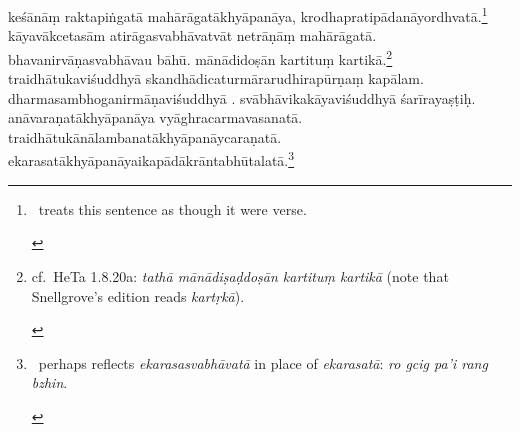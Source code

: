 \documentclass[naipra.tex]{subfiles}
\begin{document}
\begin{sanskrit}

\pstart
keśānāṃ raktapiṅgatā mahārāgatākhyāpanāya, krodhapratipādanāyordhvatā.\footnote{\begin{english}
	\TIB\ treats this sentence as though it were verse.
\end{english}}
kāyavākcetasām atirāgasvabhāvatvāt  netrāṇāṃ mahārāgatā.
bhavanirvāṇasvabhāvau bāhū.
mānādidoṣān kartituṃ kartikā.\footnote{\begin{english}
	cf.\ HeTa 1.8.20a: \emph{tathā mānādiṣaḍdoṣān kartituṃ kartikā} (note that Snellgrove's edition reads \emph{kartṛkā}).
\end{english}}
traidhātukaviśuddhyā skandhādicaturmārarudhirapūrṇaṃ   kapālam.
dharmasambhoganirmāṇaviśuddhyā . %
svābhāvikakāyaviśuddhyā śarīrayaṣṭiḥ.
anāvaraṇatākhyāpanāya vyāghracarmavasanatā.
traidhātukānālambanatākhyāpanāy\crux {}\crux caraṇatā.
ekarasatākhyāpanāyaikapādākrāntabhūtalatā.\footnote{\begin{english}
	\TIB\ perhaps reflects \emph{ekarasasvabhāvatā} in place of \emph{ekarasatā}: \emph{ro gcig pa'i rang bzhin}.
\end{english}}
\pend




\end{sanskrit}
\end{document}
